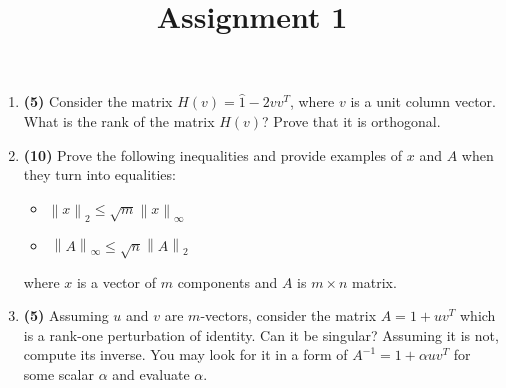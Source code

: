 \documentclass[prb,papersize=a4paper,notitlepage]{revtex4-2}%
\newcommand{\norm}[1]{\left\lVert#1\right\rVert}
\begin{document}
\title{Assignment 1}

\maketitle

\begin{enumerate}

\item \textbf{(5)} Consider the matrix $H(v)=\hat 1 - 2 v v^T$, where $v$ is a unit column vector. What is the rank of the matrix $H(v)$? Prove that it is orthogonal.

\item \textbf{(10)} Prove the following inequalities and provide examples of $x$ and $A$ when they turn into equalities:
\begin{itemize}
\item $\norm{x}_2 \le \sqrt{m}\norm{x}_\infty$
\item $\
\norm{A}_\infty \le \sqrt{n} \norm{A}_2$
\end{itemize}
where $x$ is a vector of $m$ components and $A$ is $m\times n$ matrix.

\item \textbf{(5)} Assuming $u$ and $v$ are $m$-vectors, consider the matrix $A=1+u v^T$ which is a rank-one perturbation of identity. Can it be singular? Assuming it is not, compute its inverse. You may look for it in a form of $A^{-1}=1+\alpha u v^T$ for some scalar $\alpha$ and evaluate $\alpha$.


\end{enumerate}
\end{document}

